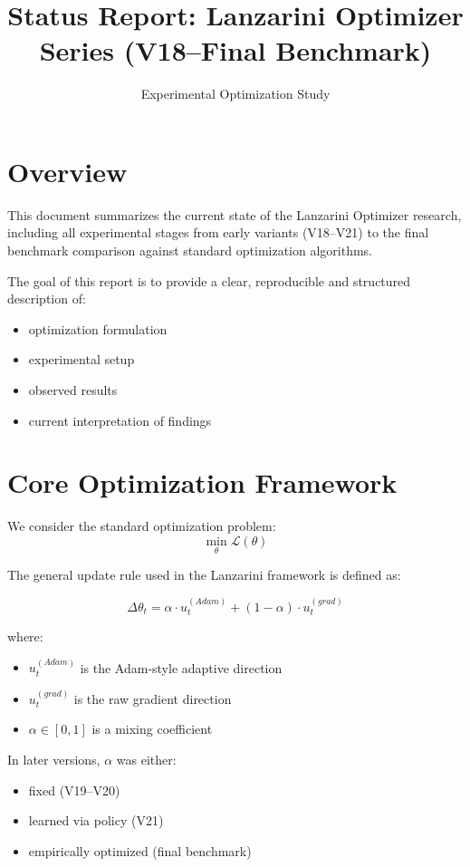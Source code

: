 \documentclass{article}
\title{Status Report: Lanzarini Optimizer Series (V18--Final Benchmark)}
\author{Experimental Optimization Study}
\date{}
\begin{document}
\maketitle

\section{Overview}

This document summarizes the current state of the Lanzarini Optimizer research, including all experimental stages from early variants (V18--V21) to the final benchmark comparison against standard optimization algorithms.

The goal of this report is to provide a clear, reproducible and structured description of:
\begin{itemize}
    \item optimization formulation
    \item experimental setup
    \item observed results
    \item current interpretation of findings
\end{itemize}

\section{Core Optimization Framework}

We consider the standard optimization problem:
\[
\min_{\theta} \mathcal{L}(\theta)
\]

The general update rule used in the Lanzarini framework is defined as:

\begin{equation}
\Delta \theta_t = \alpha \cdot u_t^{(Adam)} + (1 - \alpha) \cdot u_t^{(grad)}
\end{equation}

where:

\begin{itemize}
    \item $u_t^{(Adam)}$ is the Adam-style adaptive direction
    \item $u_t^{(grad)}$ is the raw gradient direction
    \item $\alpha \in [0,1]$ is a mixing coefficient
\end{itemize}

In later versions, $\alpha$ was either:
\begin{itemize}
    \item fixed (V19--V20)
    \item learned via policy (V21)
    \item empirically optimized (final benchmark)
\end{itemize}
\end{document}
